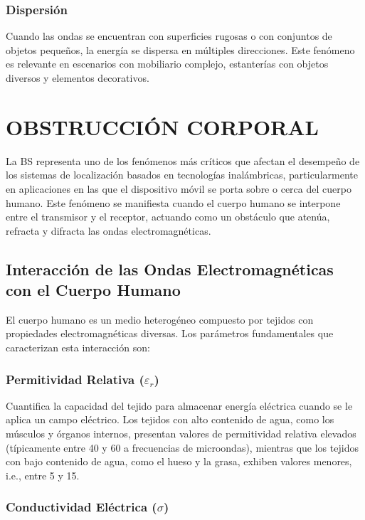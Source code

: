 \subsubsection{Dispersión}

Cuando las ondas se encuentran con superficies rugosas o con conjuntos de objetos pequeños, la energía se dispersa en múltiples direcciones. Este fenómeno es relevante en escenarios con mobiliario complejo, estanterías con objetos diversos y elementos decorativos.


\section{OBSTRUCCIÓN CORPORAL}
\label{sec:obstruccion_corporal}

La BS representa uno de los fenómenos más críticos que afectan el desempeño de los sistemas de localización basados en tecnologías inalámbricas, particularmente en aplicaciones en las que el dispositivo móvil se porta sobre o cerca del cuerpo humano. Este fenómeno se manifiesta cuando el cuerpo humano se interpone entre el transmisor y el receptor, actuando como un obstáculo que atenúa, refracta y difracta las ondas electromagnéticas.

\subsection{Interacción de las Ondas Electromagnéticas con el Cuerpo Humano}

El cuerpo humano es un medio heterogéneo compuesto por tejidos con propiedades electromagnéticas diversas. Los parámetros fundamentales que caracterizan esta interacción son:

\subsubsection{Permitividad Relativa ($\varepsilon_r$)}

Cuantifica la capacidad del tejido para almacenar energía eléctrica cuando se le aplica un campo eléctrico. Los tejidos con alto contenido de agua, como los músculos y órganos internos, presentan valores de permitividad relativa elevados (típicamente entre 40 y 60 a frecuencias de microondas), mientras que los tejidos con bajo contenido de agua, como el hueso y la grasa, exhiben valores menores, i.e., entre 5 y 15.

\subsubsection{Conductividad Eléctrica ($\sigma$)}

